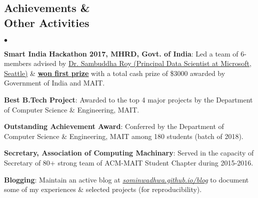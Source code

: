 \documentclass[margin,line]{res}
\newenvironment{list2}{
  \begin{list}{$\bullet$}{%
      \setlength{\itemsep}{0in}
      \setlength{\parsep}{0in} \setlength{\parskip}{0in}
      \setlength{\topsep}{0in} \setlength{\partopsep}{0in}
      \setlength{\leftmargin}{0.2in}}}{\end{list}}
\begin{document}
\begin{resume}
\section{\sc Achievements \& \\ Other Activities}
\begin{list2}
\item {\bf Smart India Hackathon 2017, MHRD, Govt. of India}: Led a team of 6-members advised by {\href{https://www.linkedin.com/in/sambuddharoy/}{Dr. Sambuddha Roy (Principal Data Scientist at Microsoft, Seattle)}} \& {\href{https://www.linkedin.com/feed/update/urn:li:activity:6255398180318470144}{\bf {\underline{won first prize}}}} with a total cash prize of \$3000 awarded by Government of India and MAIT.
\item {\bf Best B.Tech Project}: Awarded to the top 4 major projects by the Department of Computer Science \& Engineering, MAIT.
\item {\bf Outstanding Achievement Award}: Conferred by the Department of Computer Science \& Engineering, MAIT among 180 students (batch of 2018).
\item {\bf Secretary, Association of Computing Machinary}: Served in the capacity of Secretary of 80+ strong team of ACM-MAIT Student Chapter during 2015-2016.
\item {\bf Blogging}: Maintain an active blog at \textit{{\href{https://sominwadhwa.github.io/blog/}{sominwadhwa.github.io/blog}}} to document some of my experiences \& selected projects (for reproducibility).
\end{list2}
\end{resume}
\end{document}
